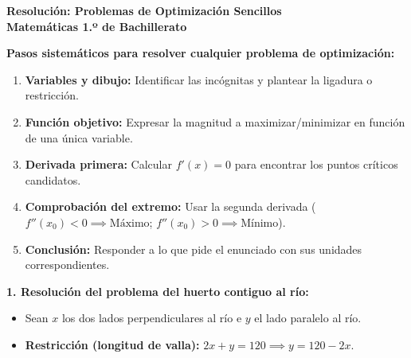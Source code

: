 ﻿\documentclass[11pt,a4paper]{article}
\begin{document}
\pagestyle{empty}

\begin{center}
    {\LARGE \textbf{Resolución: Problemas de Optimización Sencillos}}\\[4pt]
    {\large \textbf{Matemáticas 1.º de Bachillerato}}
\end{center}

\vspace{0.2cm}
\begin{tcolorbox}
\textbf{Pasos sistemáticos para resolver cualquier problema de optimización:}
\begin{enumerate}[leftmargin=1.5em, itemsep=2pt]
    \item \textbf{Variables y dibujo:} Identificar las incógnitas y plantear la ligadura o restricción.
    \item \textbf{Función objetivo:} Expresar la magnitud a maximizar/minimizar en función de una única variable.
    \item \textbf{Derivada primera:} Calcular $f'(x) = 0$ para encontrar los puntos críticos candidatos.
    \item \textbf{Comprobación del extremo:} Usar la segunda derivada ($f''(x_0) < 0 \implies \text{Máximo}$; $f''(x_0) > 0 \implies \text{Mínimo}$).
    \item \textbf{Conclusión:} Responder a lo que pide el enunciado con sus unidades correspondientes.
\end{enumerate}
\end{tcolorbox}

\vspace{0.2cm}
\noindent\textbf{1. Resolución del problema del huerto contiguo al río:}

\begin{itemize}[leftmargin=1.5em, itemsep=2pt]
    \item Sean $x$ los dos lados perpendiculares al río e $y$ el lado paralelo al río.
    \item \textbf{Restricción (longitud de valla):} $2x + y = 120 \implies y = 120 - 2x$.
\end{itemize}
\end{document}
